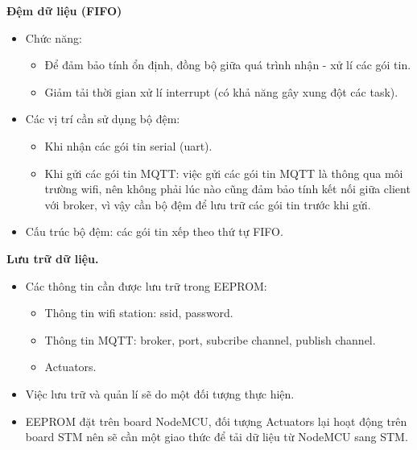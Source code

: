 \documentclass[a4paper,12pt,oneside]{article}
\begin{document}
\noindent	\textbf{Đệm dữ liệu (FIFO)}
	\begin{itemize}
	\item Chức năng:
		\begin{itemize}
		\item	Để đảm bảo tính ổn định, đồng bộ giữa quá trình nhận - xử lí các gói tin.
		\item	Giảm tải thời gian xử lí interrupt (có khả năng gây xung đột các task).
		\end{itemize}
	\item	Các vị trí cần sử dụng bộ đệm:
		\begin{itemize}
		\item	Khi  nhận các gói tin serial (uart).
		\item	Khi gửi các gói tin MQTT: việc gửi các gói tin MQTT là thông qua môi trường wifi, nên không phải lúc nào cũng đảm bảo tính kết nối giữa client với broker, vì vậy cần bộ đệm để lưu trữ các gói tin trước khi gửi.
		\end{itemize}
	\item	Cấu trúc bộ đệm: các gói tin xếp theo thứ tự FIFO.
	\end{itemize}


\noindent	\textbf{Lưu trữ dữ liệu.}
	\begin{itemize}
	\item	Các thông tin cần được lưu trữ trong EEPROM:
		\begin{itemize}
		\item	Thông tin wifi station: ssid, password.
		\item	Thông tin MQTT: broker, port, subcribe channel, publish channel.
		\item	Actuators.
		\end{itemize}
	\item	Việc lưu trữ và quản lí sẽ do một đối tượng thực hiện.
	
	\item	EEPROM đặt trên board NodeMCU, đối tượng Actuators lại hoạt động trên board STM nên sẽ cần một giao thức để tải dữ liệu từ NodeMCU sang STM. 

	\end{itemize}
\end{document}
